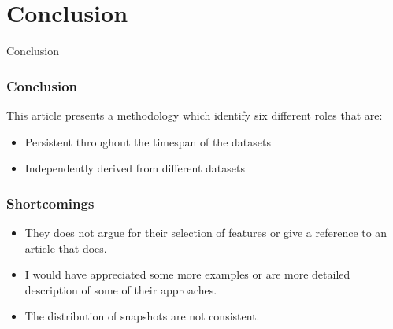 \section{Conclusion}

\begin{frame}
\begin{center}
     	\huge Conclusion
     \end{center}
\end{frame}

\begin{frame}
\frametitle{Conclusion}
This article presents a methodology which identify six different roles that are:
\begin{itemize}
	\item Persistent throughout the timespan of the datasets
	\item Independently derived from different datasets
\end{itemize}
\end{frame}

\begin{frame}
\frametitle{Shortcomings}
\begin{itemize}
\item They does not argue for their selection of features or give a reference to an article that does.
\item I would have appreciated some more examples or are more detailed description of some of their approaches.
\item The distribution of snapshots are not consistent.
\end{itemize}
\end{frame}
